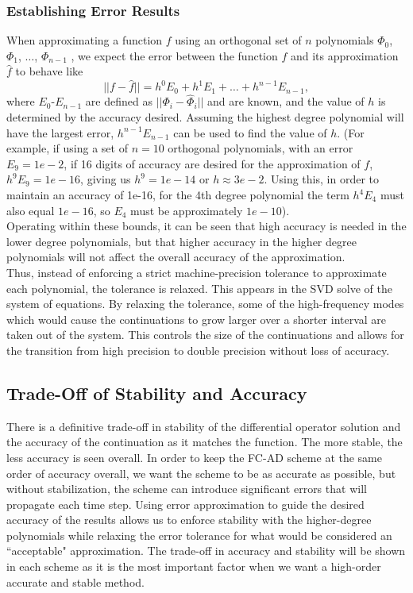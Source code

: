 \documentclass[11pt]{amsart}
\begin{document}
\subsubsection{Establishing Error Results}
When approximating a function $f$ using an orthogonal set of $n$ polynomials $\Phi_0$, $\Phi_1$, $\ldots$, $\Phi_{n-1}$ , we expect the error between the function $f$ and its approximation $\hat{f}$ to behave like
\begin{equation}
||f-\hat{f}|| = h^0 E_0 + h^1 E_1 + \ldots + h^{n-1} E_{n-1},
\end{equation} 
where $E_0$-$E_{n-1}$ are defined as $||\Phi_i-\hat{\Phi}_i||$ and are known, and the value of $h$ is determined by the accuracy desired. 
Assuming the highest degree polynomial will have the largest error, $h^{n-1}E_{n-1}$ can be used to find the value of $h$. 
(For example, if using a set of $n=10$ orthogonal polynomials, with an error $E_9=1e-2$, if 16 digits of accuracy are desired for the approximation of $f$, $h^9 E_9  = 1e-16$, giving us $h^9=1e-14$ or $h\approx 3e-2$.  Using this, in order to maintain an accuracy of 1e-16, for the 4th degree polynomial the term $h^4E_4$ must also equal $1e-16$, so $E_4$ must be approximately $1e-10$).  \\Operating within these bounds, it can be seen that high accuracy is needed in the lower degree polynomials, but that higher accuracy in the higher degree polynomials will not affect the overall accuracy of the approximation.  \\
Thus, instead of enforcing a strict machine-precision tolerance to approximate each polynomial, the tolerance is relaxed.  This appears in the SVD solve of the system of equations.  By relaxing the tolerance, some of the high-frequency modes which would cause the continuations to grow larger over a shorter interval are taken out of the system.  This controls the size of the continuations and allows for the transition from high precision to double precision without loss of accuracy. 
\subsection{Trade-Off of Stability and Accuracy}
There is a definitive trade-off in stability of the differential operator solution and the accuracy of the continuation as it matches the function.  The more stable, the less accuracy is seen overall. In order to keep the FC-AD scheme at the same order of accuracy overall, we want the scheme to be as accurate as possible, but without stabilization, the scheme can introduce significant errors that will propagate each time step. Using error approximation to guide the desired accuracy of the results allows us to enforce stability with the higher-degree polynomials while relaxing the error tolerance for what would be considered an 	``acceptable" approximation.  The trade-off in accuracy and stability will be shown in each scheme as it is the most important factor when we want a high-order accurate and stable method. 
\end{document}
